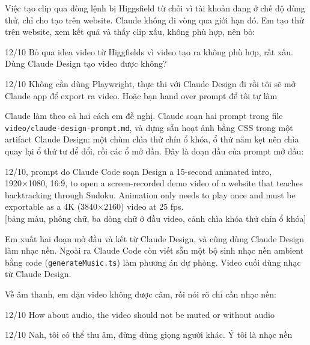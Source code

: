 Việc tạo clip qua dòng lệnh bị Higgsfield từ chối vì tài khoản đang ở chế độ dùng thử, chỉ cho tạo trên website. Claude không đi vòng qua giới hạn đó. Em tạo thử trên website, xem kết quả và thấy clip xấu, không phù hợp, nên bỏ:

\begin{promptbox}{12/10}
Bỏ qua idea video từ Higgfields vì video tạo ra không phù hợp, rất xấu. Dùng Claude Design tạo video được không?
\end{promptbox}

\begin{promptbox}{12/10}
Không cần dùng Playwright, thực thi với Claude Design đi rồi tôi sẽ mở Claude app để export ra video. Hoặc bạn hand over prompt để tôi tự làm
\end{promptbox}

Claude làm theo cả hai cách em đề nghị. Claude soạn hai prompt trong file \texttt{video/\allowbreak claude-\allowbreak design-\allowbreak prompt.md}, và dựng sẵn hoạt ảnh bằng CSS trong một artifact Claude Design: một chùm chìa thử chín ổ khóa, ổ thứ năm kẹt nên chìa quay lại ổ thứ tư để đổi, rồi các ổ mở dần. Đây là đoạn đầu của prompt mở đầu:

\begin{promptbox}{12/10, prompt do Claude Code soạn}
Design a 15-second animated intro, 1920×1080, 16:9, to open a screen-recorded demo video of a website that teaches backtracking through Sudoku. Animation only needs to play once and must be exportable as a 4K (3840×2160) video at 25 fps.\\[0pt]
[bảng màu, phông chữ, ba dòng chữ ở đầu video, cảnh chìa khóa thử chín ổ khóa]
\end{promptbox}

Em xuất hai đoạn mở đầu và kết từ Claude Design, và cũng dùng Claude Design làm nhạc nền. Ngoài ra Claude Code còn viết sẵn một bộ sinh nhạc nền ambient bằng code (\texttt{generate\allowbreak Music.ts}) làm phương án dự phòng. Video cuối dùng nhạc từ Claude Design.

Về âm thanh, em dặn video không được câm, rồi nói rõ chỉ cần nhạc nền:

\begin{promptbox}{12/10}
How about audio, the video should not be muted or without audio
\end{promptbox}

\begin{promptbox}{12/10}
Nah, tôi có thể thu âm, đừng dùng giọng người khác. Ý tôi là nhạc nền
\end{promptbox}

